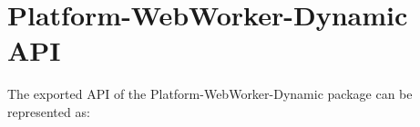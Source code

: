 \section{Platform-WebWorker-Dynamic API}

The exported API of the Platform-WebWorker-Dynamic package can be represented
as:
